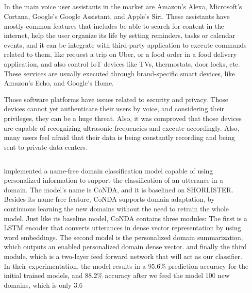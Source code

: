\subsection{\RQII}

In \cite{Hoy201881} the main voice user assistants in the market are Amazon's Alexa, Microsoft's Cortana, Google's Google Assistant, and Apple's Siri. These assistants have mostly common features that includes be able to search for content in the internet, help the user organize its life by setting reminders, tasks or calendar events, and it can be integrate with third-party application to execute commands related to them, like request a trip on Uber, or a food order in a food delivery application, and also control IoT devices like TVs, thermostats, door locks, etc. These services are usually executed through brand-specific smart devices, like Amazon's Echo, and Google's Home.

Those software platforms have issues related to security and privacy. Those devices cannot yet authenticate their users by voice, and considering their privileges, they can be a huge threat. Also, it was comproved that those devices are capable of recognizing ultrasonic frequencies and execute accordingly. Also, many users feel afraid that their data is being constantly recording and being sent to private data centers.

\subsection{\RQIII}

\citet{Li20193784} implemented a name-free domain classification model capable of using personalized information to support the classification of an utterance in a domain. The model’s name is CoNDA, and it is baselined on SHORLISTER. Besides its name-free feature, CoNDA supports domain adaptation, by continuous learning the new domains without the need to retrain the whole model. Just like its baseline model, CoNDA contains three modules: The first is a LSTM encoder that converts utterances in dense vector representation by using word embeddings. The second model is the personalized domain summarization, which outputs an enabled personalized domain dense vector. and finally the third module, which is a two-layer feed forward network that will act as our classifier. In their experimentation, the model results in a 95.6\% prediction accuracy for the initial trained models, and 88.2\% accuracy after we feed the model 100 new domains, which is only 3.6%


